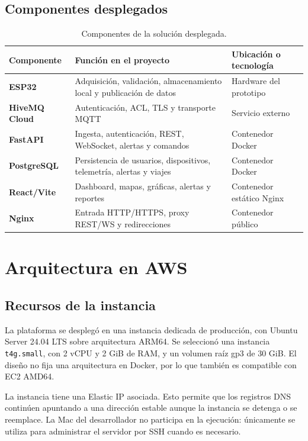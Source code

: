 \documentclass[12pt,a4paper,oneside]{report}
\newcommand{\code}[1]{\texttt{\small #1}}
\begin{document}
\section{Componentes desplegados}

\begin{table}[ht]
\centering
\small
\begin{tabularx}{\textwidth}{>{\bfseries}l X X}
\toprule
Componente & Función en el proyecto & Ubicación o tecnología \\
\midrule
ESP32 & Adquisición, validación, almacenamiento local y publicación de datos &
  Hardware del prototipo \\
HiveMQ Cloud & Autenticación, ACL, TLS y transporte MQTT & Servicio externo \\
FastAPI & Ingesta, autenticación, REST, WebSocket, alertas y comandos & Contenedor Docker \\
PostgreSQL & Persistencia de usuarios, dispositivos, telemetría, alertas y viajes & Contenedor Docker \\
React/Vite & Dashboard, mapas, gráficas, alertas y reportes & Contenedor estático Nginx \\
Nginx & Entrada HTTP/HTTPS, proxy REST/WS y redirecciones & Contenedor público \\
\bottomrule
\end{tabularx}
\caption{Componentes de la solución desplegada.}
\end{table}

\chapter{Arquitectura en AWS}

\section{Recursos de la instancia}

La plataforma se desplegó en una instancia dedicada de producción, con Ubuntu
Server 24.04 LTS sobre arquitectura
ARM64. Se seleccionó una instancia \code{t4g.small}, con 2 vCPU y 2 GiB de RAM,
y un volumen raíz gp3 de 30 GiB. El diseño no fija una arquitectura en Docker,
por lo que también es compatible con EC2 AMD64.

La instancia tiene una Elastic IP asociada. Esto permite que los registros DNS
continúen apuntando a una dirección estable aunque la instancia se detenga o se
reemplace. La Mac del desarrollador no participa en la ejecución: únicamente se
utiliza para administrar el servidor por SSH cuando es necesario.
\end{document}
